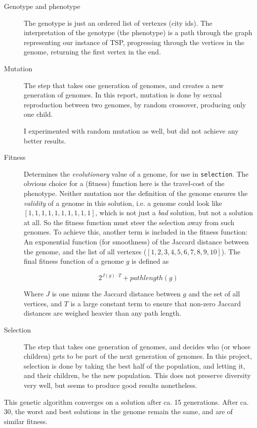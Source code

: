 \documentclass[a4paper, titlepage]{report}
\renewcommand{\%}{\scalebox{.9}{\oldpct}}
\begin{document}
\begin{description}
\item[Genotype and phenotype]
The genotype is just an ordered list of vertexes (city ids).
The interpretation of the genotype (the phenotype) is a path through the graph
representing our instance of TSP, progressing through the vertices in the
genome, returning the first vertex in the end.

\item[Mutation]
The step that takes one generation of genomes, and creates a
new generation of genomes. In this report, mutation is done by sexual
reproduction between two genomes, by random crossover, producing only one child.

I experimented with random mutation as well, but did
not achieve any better results.

\item[Fitness]
Determines the \textit{evolutionary} value of a genome, for use in
\texttt{selection}. The obvious choice for a (fitness) function here is the
travel-cost of the phenotype. Neither mutation nor the definition of the genome
ensures the \textit{validity} of a genome in this solution, i.e. a genome could
look like $\left[1,1,1,1,1,1,1,1,1,1\right]$, which is not just a \textit{bad}
solution, but not a solution at all. So the fitness function must steer the
selection away from such genomes. To achieve this, another term is included in
the fitness function: An exponential function (for smoothness) of the Jaccard
distance between the genome, and the list of all vertexes
($\left[1,2,3,4,5,6,7,8,9,10\right]$). 
The final fitness function of a genome $g$ is defined as

	$$2^{J(g) \cdot T} + pathlength(g)$$

Where $J$ is one minus the Jaccard distance between $g$ and the set of all
vertices, and $T$ is a large constant term to ensure that non-zero Jaccard
distances are weighed heavier than any path length.

\item[Selection]
The step that takes one generation of genomes, and decides who (or whose children)
gets to be part of the next generation of genomes.
In this project, selection is done by taking the best half of the population, and
letting it, and their children, be the new population.
This does not preserve diversity very well, but seems to produce good results
nonetheless.
\end{description}

This genetic algorithm converges on a solution after ca. 15 generations. After ca. 30, the worst and best solutions in the genome remain the same, and are of similar fitness.
\end{document}
